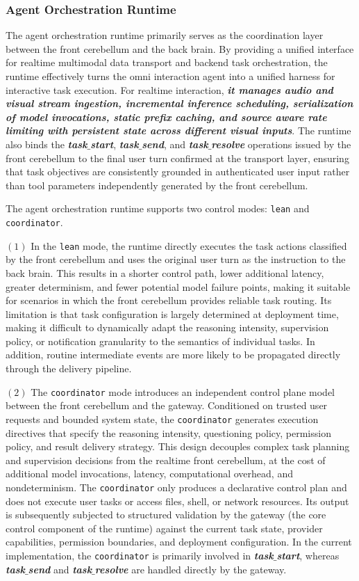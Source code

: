 \subsubsection{Agent Orchestration Runtime}
The agent orchestration runtime primarily serves as the coordination layer between the front cerebellum and the back brain. By providing a unified interface for realtime multimodal data transport and backend task orchestration, the runtime effectively turns the omni interaction agent into a unified harness for interactive task execution. For realtime interaction, \textbf{\textit{it manages audio and visual stream ingestion, incremental inference scheduling, serialization of model invocations, static prefix caching, and source aware rate limiting with persistent state across different visual inputs}}. The runtime also binds the \textbf{\textit{task$\_$start}}, \textbf{\textit{task$\_$send}}, and \textbf{\textit{task$\_$resolve}} operations issued by the front cerebellum to the final user turn confirmed at the transport layer, ensuring that task objectives are consistently grounded in authenticated user input rather than tool parameters independently generated by the front cerebellum.


The agent orchestration runtime supports two control modes: \texttt{lean} and \texttt{coordinator}. 


$(1)$ In the \texttt{lean} mode, the runtime directly executes the task actions classified by the front cerebellum and uses the original user turn as the instruction to the back brain. This results in a shorter control path, lower additional latency, greater determinism, and fewer potential model failure points, making it suitable for scenarios in which the front cerebellum provides reliable task routing. Its limitation is that task configuration is largely determined at deployment time, making it difficult to dynamically adapt the reasoning intensity, supervision policy, or notification granularity to the semantics of individual tasks. In addition, routine intermediate events are more likely to be propagated directly through the delivery pipeline.

$(2)$ The \texttt{coordinator} mode introduces an independent control plane model between the front cerebellum and the gateway. Conditioned on trusted user requests and bounded system state, the \texttt{coordinator} generates execution directives that specify the reasoning intensity, questioning policy, permission policy, and result delivery strategy. This design decouples complex task planning and supervision decisions from the realtime front cerebellum, at the cost of additional model invocations, latency, computational overhead, and nondeterminism. The \texttt{coordinator} only produces a declarative control plan and does not execute user tasks or access files, shell, or network resources. Its output is subsequently subjected to structured validation by the gateway (the core control component of the runtime) against the current task state, provider capabilities, permission boundaries, and deployment configuration. In the current implementation, the \texttt{coordinator} is primarily involved in \textbf{\textit{task$\_$start}}, whereas \textbf{\textit{task$\_$send}} and \textbf{\textit{task$\_$resolve}} are handled directly by the gateway.


